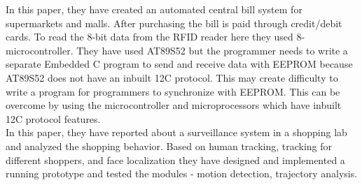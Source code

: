 \documentclass[conference]{IEEEtran}
\begin{document}
In this paper\cite{b23}, they have created an automated central bill system for supermarkets and malls. After purchasing the bill is paid through credit/debit cards. To read the 8-bit data from the RFID reader here they used 8-microcontroller. They have used AT89S52 but the programmer needs to write a separate Embedded C program to send and receive data with EEPROM because AT89S52 does not have an inbuilt 12C protocol. This may create difficulty to write a program for programmers to synchronize with EEPROM. This can be overcome by using the microcontroller and microprocessors which have inbuilt 12C protocol features.\\

In this paper\cite{b24}, they have reported about a surveillance system in a shopping lab and analyzed the shopping behavior. Based on human tracking, tracking for different shoppers, and face localization they have designed and implemented a running prototype and tested the modules - motion detection, trajectory analysis. \\
\end{document}
